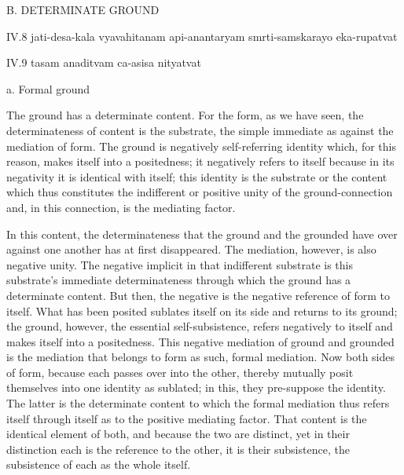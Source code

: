 B. DETERMINATE GROUND

IV.8
jati-desa-kala vyavahitanam api-anantaryam smrti-samskarayo eka-rupatvat

IV.9
tasam anaditvam ca-asisa nityatvat

a. Formal ground

The ground has a determinate content.
For the form, as we have seen,
the determinateness of content is the substrate,
the simple immediate as against the mediation of form.
The ground is negatively self-referring identity which,
for this reason, makes itself into a positedness;
it negatively refers to itself because in its negativity
it is identical with itself;
this identity is the substrate or the content
which thus constitutes the indifferent
or positive unity of the ground-connection
and, in this connection, is the mediating factor.

In this content, the determinateness that the ground and the grounded
have over against one another has at first disappeared.
The mediation, however, is also negative unity.
The negative implicit in that indifferent substrate is
this substrate's immediate determinateness through which
the ground has a determinate content.
But then, the negative is the negative reference of form to itself.
What has been posited sublates itself on its side
and returns to its ground;
the ground, however, the essential self-subsistence,
refers negatively to itself and makes itself into a positedness.
This negative mediation of ground and grounded is
the mediation that belongs to form as such, formal mediation.
Now both sides of form, because each passes over into the other,
thereby mutually posit themselves into one identity as sublated;
in this, they pre-suppose the identity.
The latter is the determinate content
to which the formal mediation thus refers itself
through itself as to the positive mediating factor.
That content is the identical element of both,
and because the two are distinct,
yet in their distinction each is
the reference to the other,
it is their subsistence,
the subsistence of each as the whole itself.

